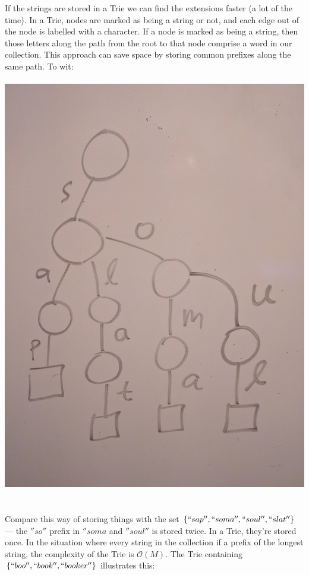 \documentclass[a4paper,12pt]{article}
\begin{document}
If the strings are stored in a Trie we can find the extensions faster (a lot of the time). In a Trie, nodes are marked as being a string or not, and each edge out of the node is labelled with a character. If a node is marked as being a string, then those letters along the path from the root to that node comprise a word in our collection. This approach can save space by storing common prefixes along the same path. To wit: 
~\\~\\
\includegraphics[scale=0.1]{fig_average}
~\\~\\
\noindent
Compare this way of storing things with the set $\{ ``sap'', ``soma'', ``soul'', ``slat'' \}$ --- the $''so''$ prefix in $''soma$ and $''soul''$ is stored twice. In a Trie, they're stored once. In the situation where every string in the collection if a prefix of the longest string, the complexity of the Trie is $\mathcal{O}(M)$. The Trie containing $\{ ``boo'', ``book'', ``booker'' \}$ illustrates this:
\end{document}
